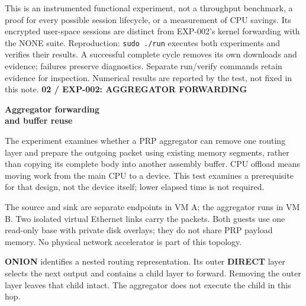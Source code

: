 \documentclass[10pt,a4paper]{article}
\newcommand{\eyebrow}[1]{{\small\bfseries\color{teal}\MakeUppercase{#1}}\par}
\newcommand{\sectionlabel}[1]{\par\vspace{4pt}{\large\bfseries #1}\par}
\begin{document}
This is an instrumented functional experiment, not a throughput benchmark, a proof for every possible session lifecycle, or a measurement of CPU savings. Its encrypted user-space sessions are distinct from EXP-002's kernel forwarding with the NONE suite.
\vfill
\small\color{muted}Reproduction: \texttt{sudo ./run} executes both experiments and verifies their results. A successful complete cycle removes its own downloads and evidence; failures preserve diagnostics. Separate run/verify commands retain evidence for inspection. Numerical results are reported by the test, not fixed in this note.
\newpage
\normalsize\color{ink}
\eyebrow{02 / EXP-002: aggregator forwarding}
\vspace{5pt}
{\fontsize{23}{26}\selectfont\bfseries Aggregator forwarding\\and buffer reuse}\par
The experiment examines whether a PRP aggregator can remove one routing layer and prepare the outgoing packet using existing memory segments, rather than copying its complete body into another assembly buffer. CPU offload means moving work from the main CPU to a device. This test examines a prerequisite for that design, not the device itself; lower elapsed time is not required.
\sectionlabel{Topology and packet path}
\begin{center}
\end{center}
The source and sink are separate endpoints in VM A; the aggregator runs in VM B. Two isolated virtual Ethernet links carry the packets. Both guests use one read-only base with private disk overlays; they do not share PRP payload memory. No physical network accelerator is part of this topology.
\sectionlabel{Protocol elements used in the test}
\textbf{ONION} identifies a nested routing representation. Its outer \textbf{DIRECT} layer selects the next output and contains a child layer to forward. Removing the outer layer leaves that child intact. The aggregator does not execute the child in this hop.
\end{document}
